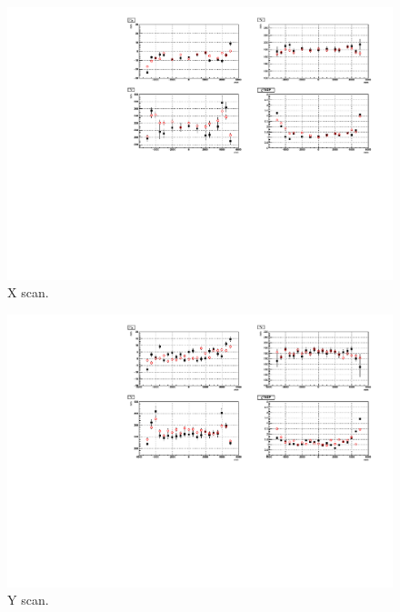\begin{figure}
	\centering
	\includegraphics[width=15cm]{MPW_N16_xscanResol_itrCut.pdf}
	\caption{X scan.}
	\label{MPWscanXResol}
\end{figure}


\begin{figure}
	\centering
	\includegraphics[width=15cm]{MPW_N16_yscanResol_itrCut.pdf}
	\caption{Y scan.}
\label{MPWscanYResol}
\end{figure}

